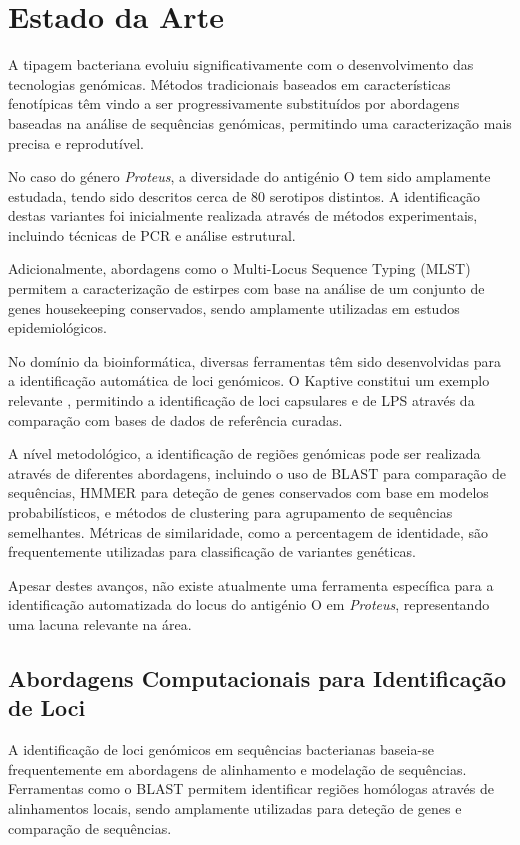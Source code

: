 \documentclass[a4paper,11pt]{article}
\begin{document}
\section{Estado da Arte}

A tipagem bacteriana evoluiu significativamente com o desenvolvimento das tecnologias genómicas. Métodos tradicionais baseados em características fenotípicas têm vindo a ser progressivamente substituídos por abordagens baseadas na análise de sequências genómicas, permitindo uma caracterização mais precisa e reprodutível.

No caso do género \textit{Proteus}, a diversidade do antigénio O tem sido amplamente estudada, tendo sido descritos cerca de 80 serotipos distintos. A identificação destas variantes foi inicialmente realizada através de métodos experimentais, incluindo técnicas de PCR e análise estrutural.

Adicionalmente, abordagens como o Multi-Locus Sequence Typing (MLST) \cite{maiden1998} permitem a caracterização de estirpes com base na análise de um conjunto de genes housekeeping conservados, sendo amplamente utilizadas em estudos epidemiológicos.

No domínio da bioinformática, diversas ferramentas têm sido desenvolvidas para a identificação automática de loci genómicos. O Kaptive constitui um exemplo relevante \cite{lam2022}, permitindo a identificação de loci capsulares e de LPS através da comparação com bases de dados de referência curadas.

A nível metodológico, a identificação de regiões genómicas pode ser realizada através de diferentes abordagens, incluindo o uso de BLAST para comparação de sequências, HMMER para deteção de genes conservados com base em modelos probabilísticos, e métodos de clustering para agrupamento de sequências semelhantes. Métricas de similaridade, como a percentagem de identidade, são frequentemente utilizadas para classificação de variantes genéticas.

Apesar destes avanços, não existe atualmente uma ferramenta específica para a identificação automatizada do locus do antigénio O em \textit{Proteus}, representando uma lacuna relevante na área.

\subsection{Abordagens Computacionais para Identificação de Loci}

A identificação de loci genómicos em sequências bacterianas baseia-se frequentemente em abordagens de alinhamento e modelação de sequências. Ferramentas como o BLAST permitem identificar regiões homólogas através de alinhamentos locais, sendo amplamente utilizadas para deteção de genes e comparação de sequências.
\end{document}
